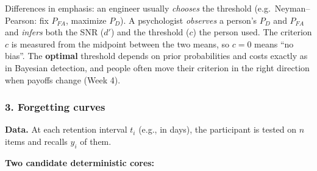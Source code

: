 Differences in emphasis: an engineer usually \emph{chooses} the
threshold (e.g.~Neyman--Pearson: fix \(P_{FA}\), maximize \(P_D\)). A
psychologist \emph{observes} a person's \(P_D\) and \(P_{FA}\) and
\emph{infers} both the SNR (\(d'\)) and the threshold (\(c\)) the person
used. The criterion \(c\) is measured from the midpoint between the two
means, so \(c = 0\) means ``no bias''. The \textbf{optimal} threshold
depends on prior probabilities and costs exactly as in Bayesian
detection, and people often move their criterion in the right direction
when payoffs change (Week 4).

\subsubsection{3. Forgetting curves}

\textbf{Data.} At each retention interval \(t_i\) (e.g., in days), the
participant is tested on \(n\) items and recalls \(y_i\) of them.

\textbf{Two candidate deterministic cores:}

